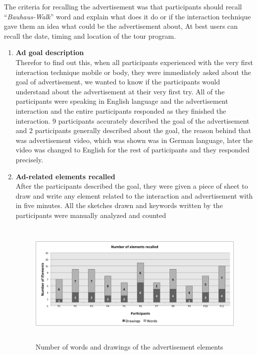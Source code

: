 	The criteria for recalling the advertisement was that participants should recall ``\emph{Bauhaus-Walk}'' word and explain what does it do or if the interaction technique gave them an idea what could be the advertisement about, At best users can recall the date, timing and location of the tour program.

\begin{enumerate}

\item	\textbf{Ad goal description} \\
Therefor to find out this, when all participants experienced with the very first interaction technique mobile or body, they were immediately asked about the goal of advertisement, we wanted to know if the participants would understand about the advertisement at their very first try. All of the participants were speaking in English language and the advertisement interaction and the entire participants responded as they finished the interaction. 9 participants accurately described the goal of the advertisement and 2 participants generally described about the goal, the reason behind that was advertisement video, which was shown was in German language, later the video was changed to English for the rest of participants and they responded precisely.

\item	\textbf{Ad-related elements recalled}  \\ 
After the participants described the goal, they were given a piece of sheet to draw and write any element related to the interaction and advertisement with in five minutes. All the sketches drawn and keywords written by the participants were manually analyzed and counted

\begin{figure}[H]
\centering
\includegraphics[width=12cm,height=6cm]{Figures/6/word_recall}%
 \caption{Number of words and drawings of the advertisement elements }%
 \label{fig:word_recall}%
\end{figure}

\end{enumerate}

